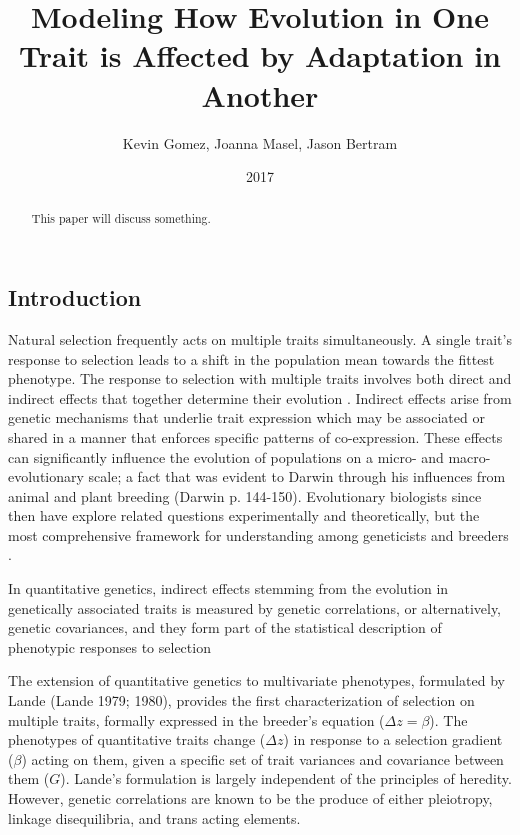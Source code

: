 \documentclass[11pt,one column]{article}
\begin{document}
\begin{multicols}{2}

\title{Modeling How Evolution in One Trait is Affected by Adaptation in Another}
\author{Kevin Gomez, Joanna Masel, Jason Bertram}
\date{2017}
\maketitle

\begin{abstract}
This paper will discuss something.
\end{abstract}

\section*{Introduction}
Natural selection frequently acts on multiple traits simultaneously. A single trait’s response to selection leads to a shift in the population mean towards the fittest phenotype.  The response to selection with multiple traits involves both direct and indirect effects that together determine their evolution \cite{Scarcelli23102007,Lovell2013,Wagner2011}.  Indirect effects arise from genetic mechanisms that underlie trait expression which may be associated or shared in a manner that enforces specific patterns of co-expression.  These effects can significantly influence the evolution of populations on a micro- and macro-evolutionary scale; a fact that was evident to Darwin through his influences from animal and plant breeding (Darwin p. 144-150).  Evolutionary biologists since then have explore related questions experimentally and theoretically, but the most comprehensive framework for understanding  among geneticists and breeders .\par

In quantitative genetics, indirect effects stemming from the evolution in genetically associated traits is measured by genetic correlations, or alternatively, genetic covariances, and they form part of the statistical description of phenotypic responses to selection 

The extension of quantitative genetics to multivariate phenotypes, formulated by Lande (Lande 1979; 1980), provides the first characterization of selection on multiple traits, formally expressed in the breeder’s equation ($\Delta z = \beta$). The phenotypes of quantitative traits change ($\Delta z$) in response to a selection gradient ($\beta$) acting on them, given a specific set of trait variances and covariance between them ($G$). Lande’s formulation is largely independent of the principles of heredity.  However, genetic correlations are known to be the produce of either pleiotropy, linkage disequilibria, and trans acting elements.\par


\end{multicols}
\end{document}

